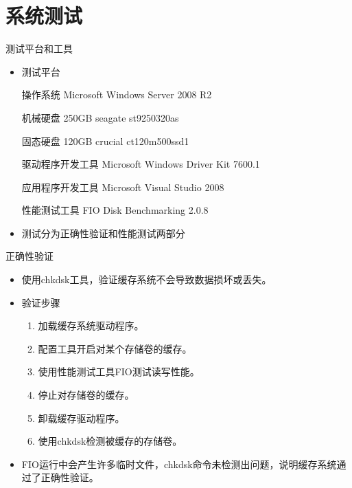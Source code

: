 \documentclass[compress]{beamer}
\begin{document}
\section{系统测试}
\begin{frame}{测试平台和工具}

\begin{itemize}
\item 测试平台

操作系统 Microsoft Windows Server 2008 R2

机械硬盘 250GB seagate st9250320as

固态硬盘 120GB crucial ct120m500ssd1

驱动程序开发工具 Microsoft Windows Driver Kit 7600.1

应用程序开发工具 Microsoft Visual Studio 2008

性能测试工具 FIO Disk Benchmarking 2.0.8

\item 测试分为正确性验证和性能测试两部分
\end{itemize}
\end{frame}

\begin{frame}{正确性验证}
\begin{itemize}
\item 使用chkdsk工具，验证缓存系统不会导致数据损坏或丢失。
\item 验证步骤
\begin{enumerate}
\item 加载缓存系统驱动程序。
\item 配置工具开启对某个存储卷的缓存。
\item 使用性能测试工具FIO测试读写性能。
\item 停止对存储卷的缓存。
\item 卸载缓存驱动程序。
\item 使用chkdsk检测被缓存的存储卷。
\end{enumerate}
\item FIO运行中会产生许多临时文件，chkdsk命令未检测出问题，说明缓存系统通过了正确性验证。
\end{itemize}
\end{frame}
\end{document}
